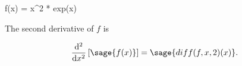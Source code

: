 \documentclass{article}
\begin{document}
\begin{sageblock}
  f(x) = x^2 * exp(x)
\end{sageblock}

The second derivative of $f$ is

\[
  \frac{\mathrm{d}^{2}}{\mathrm{d}x^{2}} \left[ \sage{f(x)} \right] =
  \sage{diff(f, x, 2)(x)}.
\]
\end{document}

